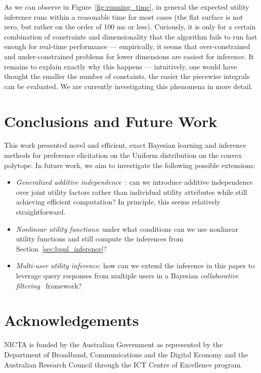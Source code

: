 \documentclass{article} %
\begin{document}
As we can observe in Figure~\ref{fig:running_time}, in general the
expected utility inference runs within a reasonable time for most
cases (the flat surface is not zero, but rather on the order of 100 ms
or less).  Curiously, it is only for a certain combination of
constraints and dimensionality that the algorithm fails to run fast
enough for real-time performance --- empirically, it seems that
over-constrained and under-constrained problems for lower dimensions
are easiest for inference.  It remains to explain exactly why this
happens --- intuitively, one would have thought the smaller the number
of constaints, the easier the piecewise integrals can be evaluated.
We are currently investigating this phenomena in more detail.

\section{Conclusions and Future Work}

This work presented novel and efficient, exact Bayesian learning and
inference methods for preference elicitation on the Uniform
distribution on the convex polytope.  In future work, we aim to
investigate the following possible extensions:
\begin{itemize}
\item {\it Generalized additive
independence}~\cite{keeney_raiffa76,bacchus_grove}: can we introduce additive
independence over joint utility factors rather than individual utility 
attributes while still achieving efficient computation?  In principle,
this seems relatively straightforward.
\item {\it Nonlinear utility functions}: under what conditions can we
use nonlinear utility functions and still compute the inferences from
Section~\ref{sec:bppl_inference}?
\item {\it Multi-user utility inference}: how can we extend the
inference in this paper to leverage query responses from multiple
users in a Bayesian \emph{collaborative filtering}~\cite{collab_filtering} 
framework?
\end{itemize}

\section*{Acknowledgements}

NICTA is funded by the Australian Government as represented by
the Department of Broadband, Communications and the Digital
Economy and the Australian Research Council through the ICT
Centre of Excellence program.


\end{document}
